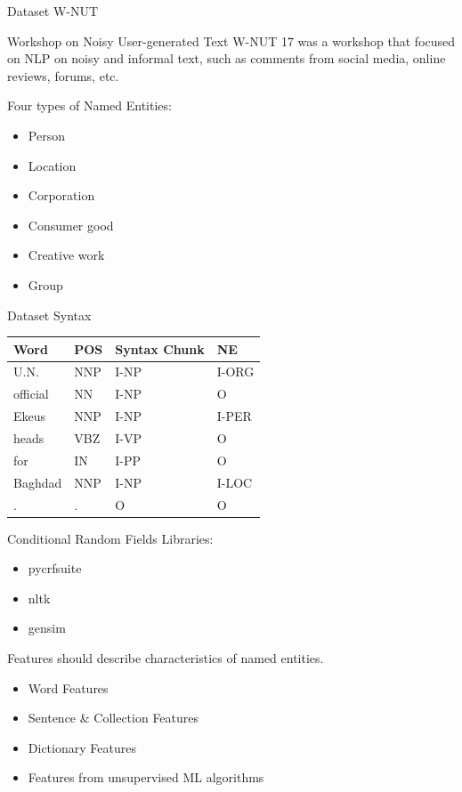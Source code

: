 \documentclass[12pt, tikz]{beamer}
\begin{document}
\begin{frame}[fragile]{Dataset W-NUT}
	
	\begin{block}{Workshop on Noisy User-generated Text}
		W-NUT 17 was a workshop that focused on NLP on noisy and informal text, such as comments from social media, online reviews, forums, etc.
	\end{block}
	
	Four types of Named Entities:
	\begin{itemize}
		\item Person
		\item Location
		\item Corporation
		\item Consumer good
		\item Creative work
		\item Group 
	\end{itemize}
	
\end{frame}

\begin{frame}[fragile]{Dataset Syntax}
	\begin{center}
		\begin{tabular}{l | l | l | l}
			Word & POS & Syntax Chunk & NE \\
			\hline
			U.N. & NNP & I-NP & I-ORG 
\\
			official & NN & I-NP & O 
\\
			Ekeus & NNP & I-NP & I-PER \\ 
			heads & VBZ & I-VP & O 
\\
			for & IN & I-PP & O \\
			Baghdad & NNP & I-NP & I-LOC \\ 
			. & . & O & O \\
		\end{tabular}
	\end{center}
\end{frame}

\begin{frame}[fragile]{Conditional Random Fields}
	Libraries:
	\begin{itemize}
		\item pycrfsuite
		\item nltk
		\item gensim
	\end{itemize}

	Features should describe characteristics of named entities.
	
	\begin{itemize}
		\item Word Features
		\item Sentence \& Collection Features
		\item Dictionary Features
		\item Features from unsupervised ML algorithms
	\end{itemize}
\end{frame}
\end{document}
